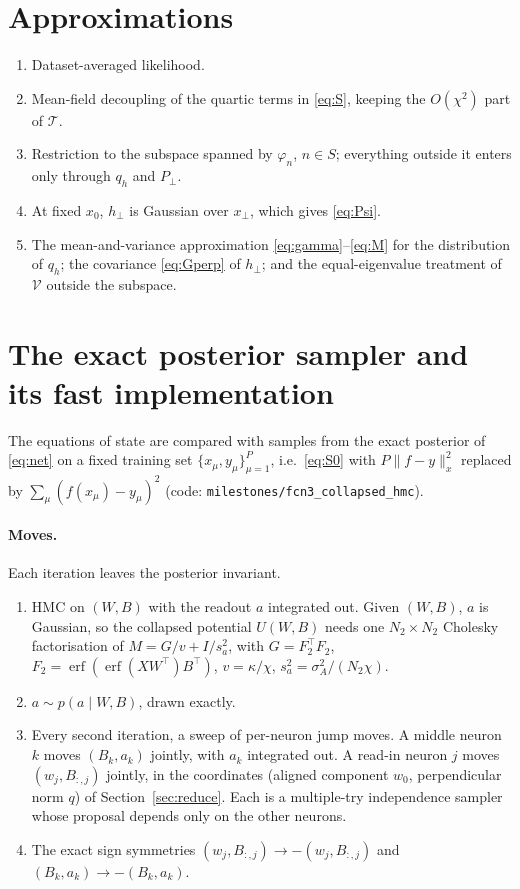 \documentclass[11pt,a4paper]{article}
\newcommand{\erf}{\operatorname{erf}}
\begin{document}
\section{Approximations}
\begin{enumerate}
  \item Dataset-averaged likelihood.
  \item Mean-field decoupling of the quartic terms in \eqref{eq:S}, keeping the $O(\chi^2)$ part of $\mathcal T$.
  \item Restriction to the subspace spanned by $\varphi_n$, $n\in S$; everything outside it enters only through $q_h$ and $P_\perp$.
  \item At fixed $x_0$, $h_\perp$ is Gaussian over $x_\perp$, which gives \eqref{eq:Psi}.
  \item The mean-and-variance approximation \eqref{eq:gamma}--\eqref{eq:M} for the distribution of $q_h$; the covariance \eqref{eq:Gperp} of $h_\perp$; and the equal-eigenvalue treatment of $\mathcal V$ outside the subspace.
\end{enumerate}

\appendix
\section{The exact posterior sampler and its fast implementation}\label{sec:sampler}
The equations of state are compared with samples from the exact posterior of \eqref{eq:net} on a fixed training set
$\{x_\mu,y_\mu\}_{\mu=1}^P$, i.e.\ \eqref{eq:S0} with $P\|f-y\|_x^2$ replaced by $\sum_\mu(f(x_\mu)-y_\mu)^2$
(code: \texttt{milestones/fcn3\_collapsed\_hmc}).

\paragraph{Moves.}
Each iteration leaves the posterior invariant.
\begin{enumerate}
  \item HMC on $(W,B)$ with the readout $a$ integrated out. Given $(W,B)$, $a$ is Gaussian, so the collapsed potential
    $U(W,B)$ needs one $N_2\times N_2$ Cholesky factorisation of $M=G/v+I/s_a^2$, with $G=F_2^\top F_2$, $F_2=\erf(\erf(XW^\top)B^\top)$, $v=\kappa/\chi$, $s_a^2=\sigma_A^2/(N_2\chi)$.
  \item $a\sim p(a\mid W,B)$, drawn exactly.
  \item Every second iteration, a sweep of per-neuron jump moves.
    A middle neuron $k$ moves $(B_k,a_k)$ jointly, with $a_k$ integrated out.
    A read-in neuron $j$ moves $(w_j,B_{:,j})$ jointly, in the coordinates (aligned component $w_0$, perpendicular norm $q$) of Section~\ref{sec:reduce}.
    Each is a multiple-try independence sampler whose proposal depends only on the other neurons.
  \item The exact sign symmetries $(w_j,B_{:,j})\to-(w_j,B_{:,j})$ and $(B_k,a_k)\to-(B_k,a_k)$.
\end{enumerate}
\end{document}
